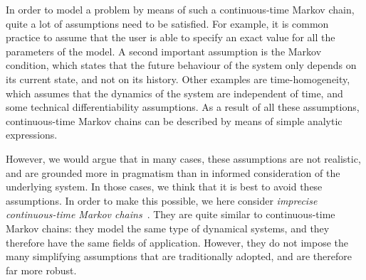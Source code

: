 \documentclass[10pt,a4paper]{paper}
\theoremstyle{definition}
\begin{document}
In order to model a problem by means of such a continuous-time Markov chain, quite a lot of assumptions need to be satisfied. %
For example, it is common practice to assume that the user is able to specify an exact value for all the parameters of the model.
A second important assumption is the Markov condition, which states that the future behaviour of the system only depends on its current state, and not on its history. Other examples are time-homogeneity, which assumes that the dynamics of the system are independent of time, and some technical differentiability assumptions. 
As a result of all these assumptions, continuous-time Markov chains can be described by means of simple analytic expressions. 


However, we would argue that in many cases, these assumptions are not realistic, and are grounded more in pragmatism than in informed consideration of the underlying system.
In those cases, we think that it is best to avoid these assumptions. In order to make this possible, we here consider \emph{imprecise continuous-time Markov chains}~\cite{Skulj:2015cq,troffaes2015using}. They are quite similar to continuous-time Markov chains: they model the same type of dynamical systems, and they therefore have the same fields of application. However, they do not impose the many simplifying assumptions that are traditionally adopted, and are therefore far more robust.


\end{document}
